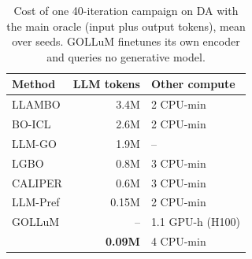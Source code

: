 \begin{table}[t]
\centering
\small
\setlength{\tabcolsep}{5pt}
\begin{tabular}{@{}l r l@{}}
\toprule
Method & LLM tokens & Other compute \\
\midrule
LLAMBO & 3.4M & 2 CPU-min \\
BO-ICL & 2.6M & 2 CPU-min \\
LLM-GO & 1.9M & -- \\
LGBO & 0.8M & 3 CPU-min \\
CALIPER & 0.6M & 3 CPU-min \\
LLM-Pref & 0.15M & 2 CPU-min \\
GOLLuM & -- & 1.1 GPU-h (H100) \\
\rowcolor{tacitrow}
\ours{} & \textbf{0.09M} & 4 CPU-min \\
\bottomrule
\end{tabular}
\caption{Cost of one 40-iteration campaign on DA with the main oracle (input plus output tokens), mean over seeds. GOLLuM finetunes its own encoder and queries no generative model.}
\label{tab:cost}
\end{table}
